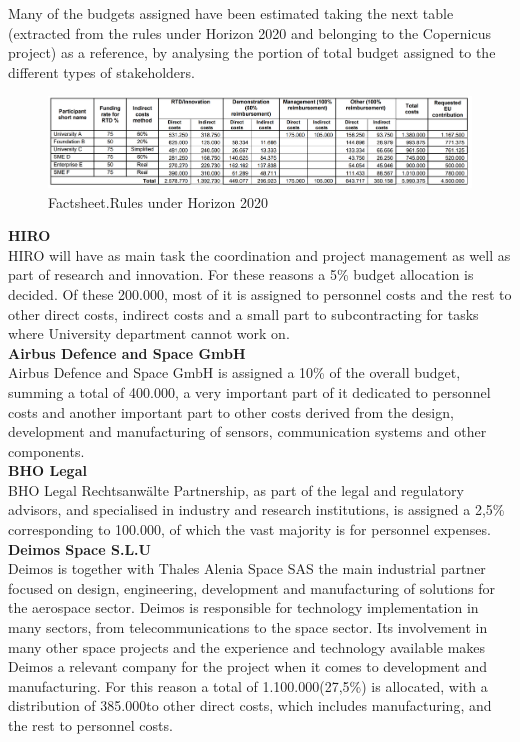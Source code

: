 Many of the budgets assigned have been estimated taking the next table (extracted from the rules under Horizon 2020 and belonging to the Copernicus project) as a reference, by analysing the portion of total budget assigned to the different types of stakeholders.


\begin{figure}[H]
\centering
\includegraphics[scale=0.45]{./images/budget/rulesBudget2020}
\caption{Factsheet.Rules under Horizon 2020}
\label{rules}
\end{figure}

\textbf{HIRO}\\

HIRO will have as main task the coordination and project management as well as part of research and innovation. For these reasons a 5\% budget allocation is decided. Of these 200.000\EUR, most of it is assigned to personnel costs and the rest to other direct costs, indirect costs and a small part to subcontracting for tasks where University department cannot work on.\\
 
\textbf{Airbus Defence and Space GmbH}\\

Airbus Defence and Space GmbH is assigned a 10\% of the overall budget, summing a total of 400.000\EUR, a very important part of it dedicated to personnel costs and another important part to other costs derived from the design, development and manufacturing of sensors, communication systems and other components.\\

\textbf{BHO Legal}\\

BHO Legal Rechtsanwälte Partnership, as part of the legal and regulatory advisors, and specialised in industry and research institutions, is assigned a 2,5\% corresponding to 100.000\EUR, of which the vast majority is for personnel expenses.\\

\textbf{Deimos Space S.L.U}\\

Deimos is together with Thales Alenia Space SAS the main industrial partner focused on design, engineering, development and manufacturing of solutions for the aerospace sector. Deimos is responsible for technology implementation in many sectors, from telecommunications to the space sector. Its involvement in many other space projects and the experience and technology available makes Deimos a relevant company for the project when it comes to development and manufacturing. For this reason a total of 1.100.000\EUR (27,5\%) is allocated, with a distribution of 385.000\EUR to other direct costs, which includes manufacturing, and the rest to personnel costs.\\
 

